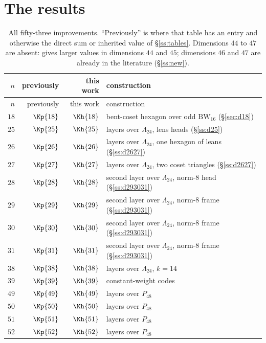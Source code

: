 \documentclass[11pt]{amsart}
\theoremstyle{remark}
\newcommand{\Leech}{\Lambda_{24}}
\newcommand{\Pff}{P_{48}}
\begin{document}
\section{The results}\label{sec:results}

\begin{longtable}{rrrl}
\caption{All fifty-three improvements. ``Previously'' is \cite{cohn-table} where
that table has an entry and otherwise the direct sum or inherited value of
\S\ref{ss:tables}. Dimensions $44$ to $47$ are absent:
\cite{sun-wang2026} gives larger values in dimensions $44$ and $45$;
dimensions $46$ and $47$ are already in the literature (\S\ref{ss:new}).}\label{tab:all}\\
\toprule
$n$ & previously & this work & construction\\
\midrule
\endfirsthead
\toprule
$n$ & previously & this work & construction\\
\midrule
\endhead
\bottomrule
\endfoot
$18$ & $\Kp{18}$ & $\Kh{18}$ & bent-coset hexagon over odd $\mathrm{BW}_{16}$ (\S\ref{sec:d18})\\
$25$ & $\Kp{25}$ & $\Kh{25}$ & layers over $\Leech$, lens heads (\S\ref{ss:d25})\\
$26$ & $\Kp{26}$ & $\Kh{26}$ & layers over $\Leech$, one hexagon of leans (\S\ref{ss:d2627})\\
$27$ & $\Kp{27}$ & $\Kh{27}$ & layers over $\Leech$, two coset triangles (\S\ref{ss:d2627})\\
$28$ & $\Kp{28}$ & $\Kh{28}$ & second layer over $\Leech$, norm-$8$ head (\S\ref{ss:d293031})\\
$29$ & $\Kp{29}$ & $\Kh{29}$ & second layer over $\Leech$, norm-$8$ frame (\S\ref{ss:d293031})\\
$30$ & $\Kp{30}$ & $\Kh{30}$ & second layer over $\Leech$, norm-$8$ frame (\S\ref{ss:d293031})\\
$31$ & $\Kp{31}$ & $\Kh{31}$ & second layer over $\Leech$, norm-$8$ frame (\S\ref{ss:d293031})\\
$38$ & $\Kp{38}$ & $\Kh{38}$ & layers over $\Leech$, $k=14$\\
$39$ & $\Kp{39}$ & $\Kh{39}$ & constant-weight codes\\
$49$ & $\Kp{49}$ & $\Kh{49}$ & layers over $\Pff$\\
$50$ & $\Kp{50}$ & $\Kh{50}$ & layers over $\Pff$\\
$51$ & $\Kp{51}$ & $\Kh{51}$ & layers over $\Pff$\\
$52$ & $\Kp{52}$ & $\Kh{52}$ & layers over $\Pff$\\

\end{longtable}
\end{document}
